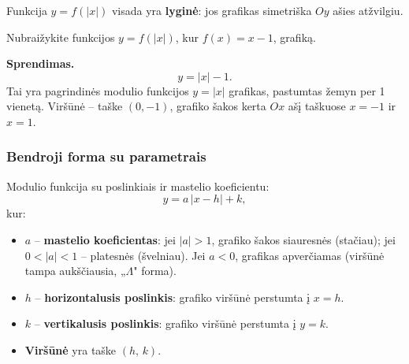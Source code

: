 \begin{remark}
Funkcija $y = f(|x|)$ visada yra \textbf{lyginė}: jos grafikas simetriška $Oy$ ašies atžvilgiu.
\end{remark}

\begin{example}
Nubraižykite funkcijos $y = f(|x|)$, kur $f(x) = x - 1$, grafiką.

\textbf{Sprendimas.}
\[
y = |x| - 1.
\]
Tai yra pagrindinės modulio funkcijos $y = |x|$ grafikas, pastumtas žemyn per 1 vienetą. Viršūnė – taške $(0, -1)$, grafiko šakos kerta $Ox$ ašį taškuose $x = -1$ ir $x = 1$.
\end{example}

\subsubsection*{Bendroji forma su parametrais}

Modulio funkcija su poslinkiais ir mastelio koeficientu:
\[
y = a\,|x - h| + k,
\]
kur:
\begin{itemize}
    \item $a$ – \textbf{mastelio koeficientas}: jei $|a| > 1$, grafiko šakos siauresnės (stačiau); jei $0 < |a| < 1$ – platesnės (švelniau). Jei $a < 0$, grafikas apverčiamas (viršūnė tampa aukščiausia, „$\Lambda$" forma).
    \item $h$ – \textbf{horizontalusis poslinkis}: grafiko viršūnė perstumta į $x = h$.
    \item $k$ – \textbf{vertikalusis poslinkis}: grafiko viršūnė perstumta į $y = k$.
    \item \textbf{Viršūnė} yra taške $(h,\, k)$.
\end{itemize}

\begin{center}
\end{center}

